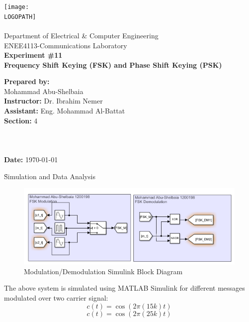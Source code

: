 \documentclass[12pt]{article}
\def \LOGOPATH {assets/birzeit-logo.png}
\def \DEPARTEMENT {Department of Electrical \& Computer Engineering}
\def \COURSENUM {ENEE4113}
\def \COURSENAME {Communications Laboratory}
\def \REPORTTITLE {Frequency Shift Keying (FSK) and Phase Shift Keying (PSK)}
\def \STUDENTNAME {Mohammad Abu-Shelbaia}
\def \STUDENTID {1200198}
\def \INSTRUCTOR {Dr. Ibrahim Nemer}
\def \ASSISTANT {Eng. Mohammad Al-Battat}
\def \REPORTNUM {11}
\begin{document}

\begin{titlepage}
    \vfill
    \begin{center}
        \texttt{[image: \\LOGOPATH]} \\
        \hfill \\
        \Large{\DEPARTEMENT} \\
        \Large{\COURSENUM\;-\;\COURSENAME} \\
        \vfill
        \textbf{\LARGE{Experiment \#\REPORTNUM}} \\
        \textbf{\LARGE{\REPORTTITLE}}
    \end{center}
    \vfill
    \begin{flushleft}
        \Large{\textbf{Prepared by:}\\ \STUDENTNAME\quad\STUDENTID} \\

        \Large{\textbf{Instructor:} \INSTRUCTOR} \\
        \Large{\textbf{Assistant:} \ASSISTANT} \\
        \Large{\textbf{Section:} 4}\\
        \LARGE{\textbf{ }}\\
        \LARGE{\textbf{ }}\\
        \LARGE{\textbf{ }}\\
        \Large{\textbf{Date:} \today}\\
    \end{flushleft}
    \vfill
\end{titlepage}


\tableofcontents
\clearpage
\setlength{\parskip}{\baselineskip}%
\listoffigures
\clearpage
{}
\h{Simulation and Data Analysis}
\begin{figure}[H]
    \centering
    \includegraphics[width=1\textwidth]{assets/main/2023-08-27-14-39-32.png}
    \caption{Modulation/Demodulation Simulink Block Diagram}
\end{figure}
The above system is simulated using MATLAB Simulink for different messages modulated over two carrier signal:
\begin{equation}
    c(t) = \cos(2\pi(15k)t)
\end{equation}
\begin{equation}
    c(t) = \cos(2\pi(25k)t)
\end{equation}
\end{document}
